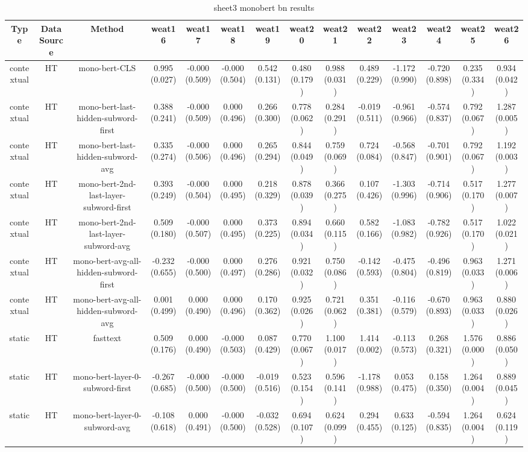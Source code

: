 \begin{sidewaystable}[htb]
    \centering
    \caption{sheet3 monobert bn results}
    \label{appendix_tab:sheet3_monobert_bn_results}
    \small
    \begin{tabular}{@{}cccccccccccccc@{}}
        \toprule
        Type & DataSource & Method & weat16 & weat17 & weat18 & weat19 & weat20 & weat21 & weat22 & weat23 & weat24 & weat25 & weat26 \\
        \midrule
        contextual & HT & mono-bert-CLS & 0.995 (0.027) & -0.000 (0.509) & -0.000 (0.504) & 0.542 (0.131) & 0.480 (0.179) & 0.988 (0.031) & 0.489 (0.229) & -1.172 (0.990) & -0.720 (0.898) & 0.235 (0.334) & 0.934 (0.042) \\
        contextual & HT & mono-bert-last-hidden-subword-first & 0.388 (0.241) & -0.000 (0.509) & 0.000 (0.496) & 0.266 (0.300) & 0.778 (0.062) & 0.284 (0.291) & -0.019 (0.511) & -0.961 (0.966) & -0.574 (0.837) & 0.792 (0.067) & 1.287 (0.005) \\
        contextual & HT & mono-bert-last-hidden-subword-avg & 0.335 (0.274) & -0.000 (0.506) & 0.000 (0.496) & 0.265 (0.294) & 0.844 (0.049) & 0.759 (0.069) & 0.724 (0.084) & -0.568 (0.847) & -0.701 (0.901) & 0.792 (0.067) & 1.192 (0.003) \\
        contextual & HT & mono-bert-2nd-last-layer-subword-first & 0.393 (0.249) & -0.000 (0.504) & 0.000 (0.495) & 0.218 (0.329) & 0.878 (0.039) & 0.366 (0.275) & 0.107 (0.426) & -1.303 (0.996) & -0.714 (0.906) & 0.517 (0.170) & 1.277 (0.007) \\
        contextual & HT & mono-bert-2nd-last-layer-subword-avg & 0.509 (0.180) & -0.000 (0.507) & 0.000 (0.495) & 0.373 (0.225) & 0.894 (0.034) & 0.660 (0.115) & 0.582 (0.166) & -1.083 (0.982) & -0.782 (0.926) & 0.517 (0.170) & 1.022 (0.021) \\
        contextual & HT & mono-bert-avg-all-hidden-subword-first & -0.232 (0.655) & -0.000 (0.500) & 0.000 (0.497) & 0.276 (0.286) & 0.921 (0.032) & 0.750 (0.086) & -0.142 (0.593) & -0.475 (0.804) & -0.496 (0.819) & 0.963 (0.033) & 1.271 (0.006) \\
        contextual & HT & mono-bert-avg-all-hidden-subword-avg & 0.001 (0.499) & 0.000 (0.490) & 0.000 (0.496) & 0.170 (0.362) & 0.925 (0.026) & 0.721 (0.062) & 0.351 (0.381) & -0.116 (0.579) & -0.670 (0.893) & 0.963 (0.033) & 0.880 (0.026) \\
        static & HT & fasttext & 0.509 (0.176) & 0.000 (0.490) & -0.000 (0.503) & 0.087 (0.429) & 0.770 (0.067) & 1.100 (0.017) & 1.414 (0.002) & -0.113 (0.573) & 0.268 (0.321) & 1.576 (0.000) & 0.886 (0.050) \\
        static & HT & mono-bert-layer-0-subword-first & -0.267 (0.685) & -0.000 (0.500) & -0.000 (0.500) & -0.019 (0.516) & 0.523 (0.154) & 0.596 (0.141) & -1.178 (0.988) & 0.053 (0.475) & 0.158 (0.350) & 1.264 (0.004) & 0.889 (0.045) \\
        static & HT & mono-bert-layer-0-subword-avg & -0.108 (0.618) & 0.000 (0.491) & -0.000 (0.500) & -0.032 (0.528) & 0.694 (0.107) & 0.624 (0.099) & 0.294 (0.455) & 0.633 (0.125) & -0.594 (0.835) & 1.264 (0.004) & 0.624 (0.119) \\
        \bottomrule
    \end{tabular}
\end{sidewaystable}